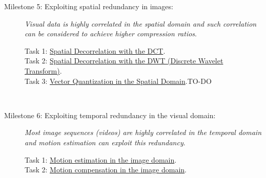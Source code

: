 \begin{description}
\item [Milestone 5: {\normalfont Exploiting spatial redundancy in
    images:}] \emph{Visual data is highly correlated in the spatial
domain and such correlation can be considered to achieve higher
compression ratios}.
  \begin{description}
  \item [Task 1: {\normalfont
      \href{https://sistemas-multimedia.github.io/contents/2D_DCT/}{Spatial
        Decorrelation with the DCT}.}]
  \item [Task 2: {\normalfont
      \href{https://sistemas-multimedia.github.io/contents/DWT/}{Spatial
        Decorrelation with the DWT (Discrete Wavelet Transform)}.}]
  \item [Task 3: {\normalfont
      \href{https://sistemas-multimedia.github.io/contents/gray_VQ/}
           {Vector Quantization in the Spatial Domain}.TO-DO}] %
  \end{description}
  ~\newline

\item [Milestone 6: {\normalfont Exploiting temporal redundancy in
    the visual domain:}] \emph{Most image sequences (videos) are highly
correlated in the temporal domain and motion estimation can exploit
this redundancy}.
  \begin{description}
  \item [Task 1: {\normalfont
      \href{https://sistemas-multimedia.github.io/contents/motion_estimation/}{Motion
        estimation in the image domain}.}]
  \item [Task 2: {\normalfont
      \href{https://sistemas-multimedia.github.io/contents/motion_compensation/}{Motion
        compensation in the image domain}.}]
  \end{description}
  ~\newline


\end{description}
